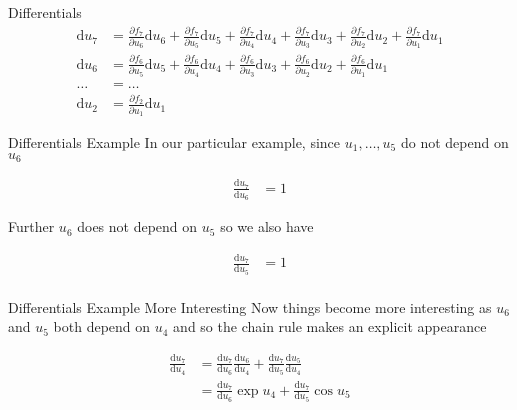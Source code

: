 \documentclass{beamer}
\begin{document}
\begin{frame}[fragile]{Differentials}
$$
\begin{aligned}
\mathrm{d}u_7    &= \frac{\partial f_7}{\partial u_6} \mathrm{d} u_6 +
                    \frac{\partial f_7}{\partial u_5} \mathrm{d} u_5 +
                    \frac{\partial f_7}{\partial u_4} \mathrm{d} u_4 +
                    \frac{\partial f_7}{\partial u_3} \mathrm{d} u_3 +
                    \frac{\partial f_7}{\partial u_2} \mathrm{d} u_2 +
                    \frac{\partial f_7}{\partial u_1} \mathrm{d} u_1 \\
\mathrm{d}u_6    &= \frac{\partial f_6}{\partial u_5} \mathrm{d} u_5 +
                    \frac{\partial f_6}{\partial u_4} \mathrm{d} u_4 +
                    \frac{\partial f_6}{\partial u_3} \mathrm{d} u_3 +
                    \frac{\partial f_6}{\partial u_2} \mathrm{d} u_2 +
                    \frac{\partial f_6}{\partial u_1} \mathrm{d} u_1 \\
\ldots           &= \ldots \\
\mathrm{d}u_2    &= \frac{\partial f_2}{\partial u_1} \mathrm{d} u_1
\end{aligned}
$$
\end{frame}

\begin{frame}[fragile]{Differentials Example}
In our particular example, since $u_1, \dots, u_5$ do not depend on $u_6$

$$
\begin{aligned}
\frac{\mathrm{d}u_7}{\mathrm{d}u_6} &= 1
\end{aligned}
$$

Further $u_6$ does not depend on $u_5$ so we also have

$$
\begin{aligned}
\frac{\mathrm{d}u_7}{\mathrm{d}u_5} &= 1 \\
\end{aligned}
$$
\end{frame}

\begin{frame}[fragile]{Differentials Example More Interesting}
Now things become more interesting as $u_6$ and $u_5$ both depend on
$u_4$ and so the chain rule makes an explicit appearance

$$
\begin{aligned}
\frac{\mathrm{d}u_7}{\mathrm{d}u_4} &=
 \frac{\mathrm{d}u_7}{\mathrm{d}u_6}\frac{\mathrm{d}u_6}{\mathrm{d}u_4} +
 \frac{\mathrm{d}u_7}{\mathrm{d}u_5}\frac{\mathrm{d}u_5}{\mathrm{d}u_4} \\
&= \frac{\mathrm{d}u_7}{\mathrm{d}u_6}\exp{u_4} +
   \frac{\mathrm{d}u_7}{\mathrm{d}u_5}\cos{u_5}
\end{aligned}
$$
\end{frame}
\end{document}
